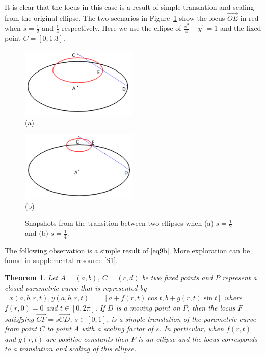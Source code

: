 \documentclass[12pt,a4paper]{article}%
\newtheorem{theorem}{Theorem}
\begin{document}
It is clear that the locus in this case is a result of simple translation and
scaling from the original ellipse. The two scenarios in Figure~\ref{fig4}
show the locus $\overrightarrow{OE}$ in red when $s=\frac{1}{2}$ and
$\frac{1}{4}$ respectively.
Here we use the ellipse of $\frac{x^{2}}{4}+y^{1}=1$ and the fixed point $C=[0,1.3]$.

\begin{figure}[htpb]
\begin{center}
\parbox[b]{2.2in}{\begin{center}
\includegraphics[width=2.2in,keepaspectratio]{exercise2-crop.pdf}
 \\ (a)
\end{center}}
\qquad
\parbox[b]{2.2in}{\begin{center}
\includegraphics[width=2.2in,keepaspectratio]{exercise2(b)-crop.pdf}
 \\ (b)
\end{center}}
\end{center}
\caption{Snapshots from the transition between two ellipses when (a) $s=\frac{1}{2}$ and (b) $s=\frac{1}{4}$.}
\label{fig4}
\end{figure}

The following observation is a simple result of \ref{eq9b}. More exploration
can be found in supplemental resource [S1].

\begin{theorem}
Let $A=\left(  a,b\right)$, $C=(c,d)$ be two fixed points and $P$ represent a
closed parametric curve that is represented by
$[x(a,b,r,t), y(a,b,r,t)] = [a+f(r,t)\cos t, b+g(r,t)\sin t]$ where $f(r,0)=0$
and $t\in[0, 2\pi]$. If $D$ is a moving point on $P$, then the locus $F$
satisfying $\overrightarrow{CF}=s\overrightarrow{CD}$, $s\in[0,1]$, is a
simple translation of the parametric curve from point $C$ to point $A$ with a
scaling factor of $s$. In particular, when $f(r,t)$ and $g(r,t)$ are positive constants
then $P$ is an ellipse and the locus corresponds to a translation and scaling of this ellipse.
\end{theorem}
\end{document}
